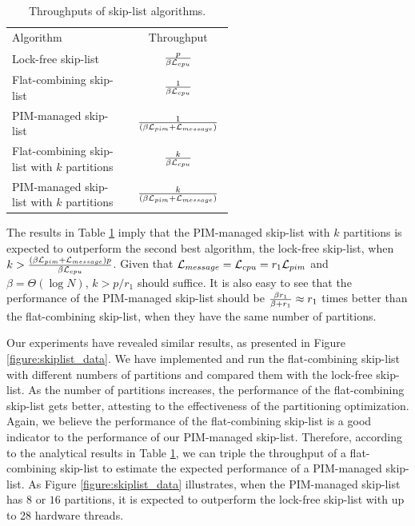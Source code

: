 \begin{table}[ht!]
\begin{center}
    \begin{tabular}{| m{0.55\linewidth}  | c |}
    \hline
    Algorithm & Throughput \\ \hhline{|=|=|} 
    Lock-free skip-list & ${p \over \beta\mathcal{L}_{cpu}}$ \\ \hline
    Flat-combining skip-list & ${1 \over \beta\mathcal{L}_{cpu}}$ \\ \hline
    PIM-managed skip-list & ${1 \over (\beta\mathcal{L}_{pim} + \mathcal{L}_{message})}$ \\ \hline
    Flat-combining skip-list with $k$ partitions & ${k \over \beta\mathcal{L}_{cpu}}$ \\ \hline
    PIM-managed skip-list with $k$ partitions & ${k \over (\beta\mathcal{L}_{pim} + \mathcal{L}_{message})}$ \\ \hline
    \end{tabular}
\end{center}
\caption{Throughputs of skip-list algorithms.}
\label{tab:skiplist}
\end{table}

The results in Table \ref{tab:skiplist} imply that 
the PIM-managed skip-list with $k$ partitions is expected to outperform the second best algorithm, 
the lock-free skip-list, when $k > {(\beta\mathcal{L}_{pim} + \mathcal{L}_{message})p \over \beta\mathcal{L}_{cpu}}$.
Given that $\mathcal{L}_{message} = \mathcal{L}_{cpu} = r_1\mathcal{L}_{pim}$ and $\beta = \Theta(\log N)$, $k > p/r_1$ should suffice.
It is also easy to see that the performance of the PIM-managed skip-list should be 
${\beta r_1 \over \beta + r_1} \approx r_1$ times better than the flat-combining skip-list, 
when they have the same number of partitions. 

Our experiments have revealed similar results, 
as presented in Figure \ref{figure:skiplist_data}.
We have implemented and run the flat-combining skip-list with different numbers of
partitions and compared them with the lock-free skip-list.
As the number of partitions increases, the performance of the flat-combining skip-list
gets better, attesting to the effectiveness of the partitioning optimization.
Again, we believe the performance of the flat-combining skip-list is a good indicator
to the performance of our PIM-managed skip-list.
Therefore, according to the analytical results in Table \ref{tab:skiplist}, we can triple the throughput 
of a flat-combining skip-list to estimate the expected performance of a PIM-managed skip-list.
As Figure \ref{figure:skiplist_data} illustrates, when the PIM-managed skip-list has $8$ or $16$ 
partitions, it is expected to outperform the lock-free skip-list with up to 28 hardware threads.

